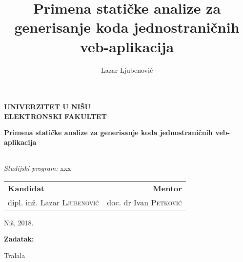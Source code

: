 \documentclass[twoside]{report}
\title{Primena statičke analize za generisanje koda jednostraničnih veb-aplikacija}
\author{Lazar Ljubenović}
\begin{document}
   
\begin{titlepage}
  \begin{center}

    \begin{minipage}[b]{0.7\textwidth}
        \centering
        \textbf{UNIVERZITET U NIŠU\\ELEKTRONSKI FAKULTET}
    \end{minipage}%
    
    \vspace{5cm}
    \LARGE
    \textbf{Primena statičke analize za generisanje koda jednostraničnih veb-aplikacija}
    
    \vspace{1cm}
    \normalsize
    \\
    \vspace{.33cm}
    \textit{Studijski program:} xxx
  \end{center}

  \vfill

  \noindent 
  \begin{tabularx}{\textwidth}{XR}
    \textbf{Kandidat}                    & \textbf{Mentor}                \\
    dipl. inž. Lazar \textsc{Ljubenović} & doc. dr Ivan \textsc{Petković}
  \end{tabularx}

  \vfill

  \begin{center}
    Niš, 2018.
  \end{center}
\end{titlepage}

\newpage

\newpage

\textbf{Zadatak:}

\vspace{0.2cm}

Tralala

\vfill
\end{document}
